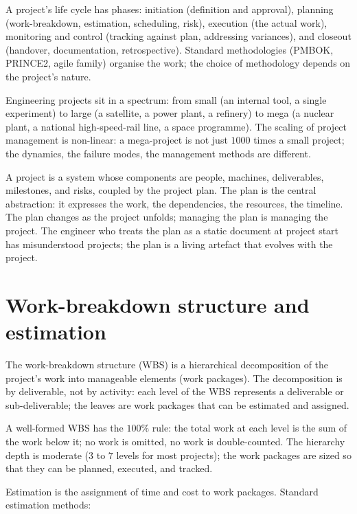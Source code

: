 A project's life cycle has phases: initiation (definition and approval), planning (work-breakdown, estimation, scheduling, risk), execution (the actual work), monitoring and control (tracking against plan, addressing variances), and closeout (handover, documentation, retrospective). Standard methodologies (PMBOK, PRINCE2, agile family) organise the work; the choice of methodology depends on the project's nature.

Engineering projects sit in a spectrum: from small (an internal tool, a single experiment) to large (a satellite, a power plant, a refinery) to mega (a nuclear plant, a national high-speed-rail line, a space programme). The scaling of project management is non-linear: a mega-project is not just $1000$ times a small project; the dynamics, the failure modes, the management methods are different.

\begin{archetype}
A project is a system whose components are people, machines, deliverables, milestones, and risks, coupled by the project plan. The plan is the central abstraction: it expresses the work, the dependencies, the resources, the timeline. The plan changes as the project unfolds; managing the plan is managing the project. The engineer who treats the plan as a static document at project start has misunderstood projects; the plan is a living artefact that evolves with the project.
\end{archetype}

\section{Work-breakdown structure and estimation}

The work-breakdown structure (WBS) is a hierarchical decomposition of the project's work into manageable elements (work packages). The decomposition is by deliverable, not by activity: each level of the WBS represents a deliverable or sub-deliverable; the leaves are work packages that can be estimated and assigned.

A well-formed WBS has the $100\%$ rule: the total work at each level is the sum of the work below it; no work is omitted, no work is double-counted. The hierarchy depth is moderate ($3$ to $7$ levels for most projects); the work packages are sized so that they can be planned, executed, and tracked.

Estimation is the assignment of time and cost to work packages. Standard estimation methods:

